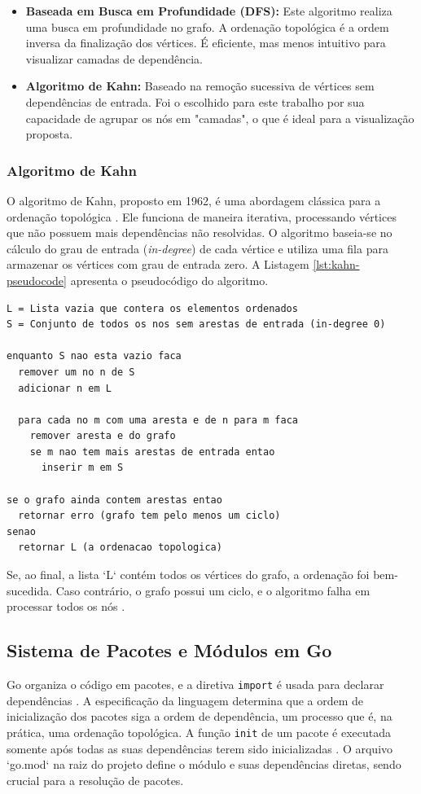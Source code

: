 \documentclass[12pt]{article}
\begin{document}
\begin{itemize}
    \item \textbf{Baseada em Busca em Profundidade (DFS):} Este algoritmo realiza uma busca em profundidade no grafo. A ordenação topológica é a ordem inversa da finalização dos vértices. É eficiente, mas menos intuitivo para visualizar camadas de dependência.
    \item \textbf{Algoritmo de Kahn:} Baseado na remoção sucessiva de vértices sem dependências de entrada. Foi o escolhido para este trabalho por sua capacidade de agrupar os nós em "camadas", o que é ideal para a visualização proposta.
\end{itemize}

\subsubsection{Algoritmo de Kahn}
O algoritmo de Kahn, proposto em 1962, é uma abordagem clássica para a ordenação topológica \cite{kahn1962}. Ele funciona de maneira iterativa, processando vértices que não possuem mais dependências não resolvidas. O algoritmo baseia-se no cálculo do grau de entrada (\textit{in-degree}) de cada vértice e utiliza uma fila para armazenar os vértices com grau de entrada zero. A Listagem \ref{lst:kahn-pseudocode} apresenta o pseudocódigo do algoritmo.

\begin{lstlisting}[language={}, caption={Pseudocódigo do Algoritmo de Kahn}, label={lst:kahn-pseudocode}]
L = Lista vazia que contera os elementos ordenados
S = Conjunto de todos os nos sem arestas de entrada (in-degree 0)

enquanto S nao esta vazio faca
  remover um no n de S
  adicionar n em L
  
  para cada no m com uma aresta e de n para m faca
    remover aresta e do grafo
    se m nao tem mais arestas de entrada entao
      inserir m em S

se o grafo ainda contem arestas entao
  retornar erro (grafo tem pelo menos um ciclo)
senao
  retornar L (a ordenacao topologica)
\end{lstlisting}

Se, ao final, a lista `L` contém todos os vértices do grafo, a ordenação foi bem-sucedida. Caso contrário, o grafo possui um ciclo, e o algoritmo falha em processar todos os nós \cite{kahn1962}.

\subsection{Sistema de Pacotes e Módulos em Go}
Go organiza o código em pacotes, e a diretiva \texttt{import} é usada para declarar dependências \cite{donovan2015go}. A especificação da linguagem determina que a ordem de inicialização dos pacotes siga a ordem de dependência, um processo que é, na prática, uma ordenação topológica. A função \texttt{init} de um pacote é executada somente após todas as suas dependências terem sido inicializadas \cite{GoSpec}. O arquivo `go.mod` na raiz do projeto define o módulo e suas dependências diretas, sendo crucial para a resolução de pacotes.
\end{document}
